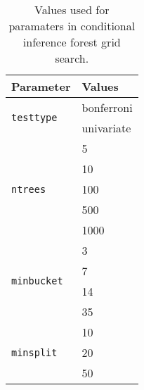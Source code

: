 \begin{table}[H]
    \centering
    \begin{tabular}{|p{3cm}|p{3cm}|}
        \hline
        \textbf{Parameter} & \textbf{Values} \\
        \hline
        \hline
        \multirow{2}{*}{\texttt{testtype}} & bonferroni \\
        & univariate \\
        \hline

        \multirow{5}{*}{\texttt{ntrees}} & 5 \\
        & 10 \\
        & 100 \\
        & 500 \\
        & 1000 \\
        \hline

        \multirow{4}{*}{\texttt{minbucket}} & 3 \\
        & 7 \\
        & 14 \\
        & 35 \\
        \hline

        \multirow{3}{*}{\texttt{minsplit}} & 10 \\
        & 20 \\
        & 50 \\
        \hline
    \end{tabular}
    \caption{Values used for paramaters in conditional inference forest grid search.}
    \label{tab:cforest_params_large}
\end{table}
